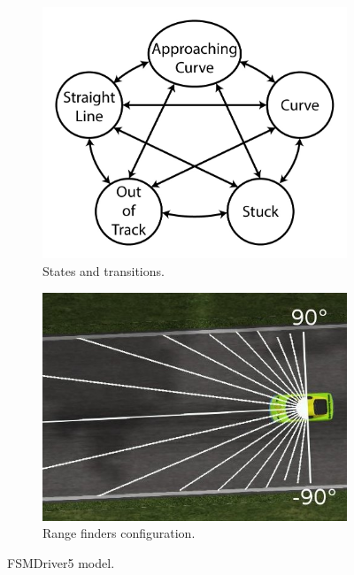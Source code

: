 \begin{figure}
\centering
\begin{subfigure}[b]{0.4\textwidth}
   \includegraphics[width=\textwidth]{img/FiveStateFSM}
   \caption{States and transitions.}\label{fig:FSMDriver5Model}%
\end{subfigure}
\begin{subfigure}[b]{0.4\textwidth}
   \includegraphics[width=\textwidth]{img/FSM5Sensors}
   \caption{Range finders configuration.}\label{fig:FSMDriver5Finders}%
\end{subfigure}
   \caption{FSMDriver5 model.}\label{fig:FSMDriver5}
\end{figure}

